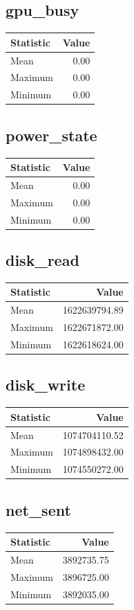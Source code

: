 \documentclass[11pt]{article}
\begin{document}
\subsection{gpu_busy}
\begin{tabular}{lr}
\toprule
Statistic & Value \\
\midrule
Mean & 0.00 \\
Maximum & 0.00 \\
Minimum & 0.00 \\
\bottomrule
\end{tabular}


\subsection{power_state}
\begin{tabular}{lr}
\toprule
Statistic & Value \\
\midrule
Mean & 0.00 \\
Maximum & 0.00 \\
Minimum & 0.00 \\
\bottomrule
\end{tabular}


\subsection{disk_read}
\begin{tabular}{lr}
\toprule
Statistic & Value \\
\midrule
Mean & 1622639794.89 \\
Maximum & 1622671872.00 \\
Minimum & 1622618624.00 \\
\bottomrule
\end{tabular}


\subsection{disk_write}
\begin{tabular}{lr}
\toprule
Statistic & Value \\
\midrule
Mean & 1074704110.52 \\
Maximum & 1074898432.00 \\
Minimum & 1074550272.00 \\
\bottomrule
\end{tabular}


\subsection{net_sent}
\begin{tabular}{lr}
\toprule
Statistic & Value \\
\midrule
Mean & 3892735.75 \\
Maximum & 3896725.00 \\
Minimum & 3892035.00 \\
\bottomrule
\end{tabular}
\end{document}

